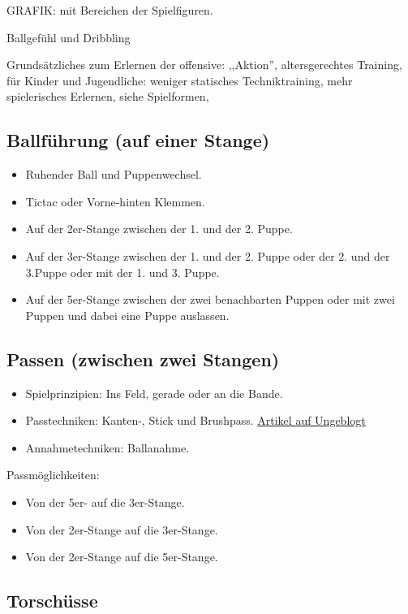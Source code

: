 GRAFIK: mit Bereichen der Spielfiguren.

Ballgefühl und Dribbling

Grundsätzliches zum Erlernen der \gls{offensive}: ,,Aktion'', altersgerechtes Training,  für Kinder und Jugendliche: weniger statisches Techniktraining, mehr spielerisches Erlernen, siehe Spielformen,


\subsection{Ballführung (auf einer Stange)} 
\label{technik:offensive:eine}

\begin{itemize}
\item Ruhender Ball und Puppenwechsel.
\item Tictac oder Vorne-hinten Klemmen.
\item Auf der 2er-Stange zwischen der 1. und der 2. Puppe.
\item Auf der 3er-Stange zwischen der 1. und der 2. Puppe oder der 2. und der 3.Puppe oder mit der 1. und 3. Puppe.
\item Auf der 5er-Stange zwischen der zwei benachbarten Puppen oder mit zwei Puppen und dabei eine Puppe auslassen.
\end{itemize}


\subsection{Passen (zwischen zwei Stangen)}
\label{technik:offensive:zwei}

\begin{itemize}
\item Spielprinzipien: Ins Feld, gerade oder an die Bande.
\item Passtechniken: Kanten-, Stick und Brushpass. 
\href{http://ungeblogtkickern.blogspot.de/2015/09/schrag-schieen.html}{Artikel auf Ungeblogt}
\item Annahmetechniken: Ballanahme.
\end{itemize}

Passmöglichkeiten:
\begin{itemize}
\item Von der 5er- auf die 3er-Stange.
\item Von der 2er-Stange auf die 3er-Stange.
\item Von der 2er-Stange auf die 5er-Stange.
\end{itemize}


\subsection{Torschüsse}
\label{technik:offensive:torschuesse}

